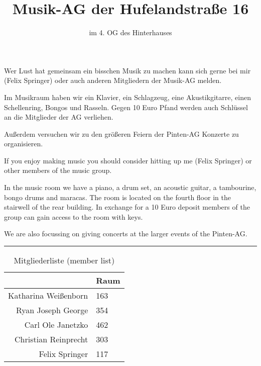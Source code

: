 \documentclass[a4paper,12pt]{scrartcl}
\title{Musik-AG der Hufelandstraße 16}
\subtitle{im 4. OG des Hinterhauses}
\author{}
\date{}
\begin{document}
\maketitle

Wer Lust hat gemeinsam ein bisschen Musik zu machen kann sich gerne bei mir (Felix Springer) oder
auch anderen Mitgliedern der Musik-AG melden.

Im Musikraum haben wir ein Klavier, ein Schlagzeug, eine Akustikgitarre, einen Schellenring, Bongos
und Rasseln.
Gegen 10 Euro Pfand werden auch Schlüssel an die Mitglieder der AG verliehen.

Außerdem versuchen wir zu den größeren Feiern der Pinten-AG Konzerte zu organisieren.

{
    \color{orange}
    If you enjoy making music you should consider hitting up me (Felix Springer) or other members
    of the music group.

    In the music room we have a piano, a drum set, an acoustic guitar, a tambourine, bongo drums
    and maracas.
    The room is located on the fourth floor in the stairwell of the rear building.
    In exchange for a 10 Euro deposit members of the group can gain access to the room
    with keys.

    We are also focussing on giving concerts at the larger events of the Pinten-AG.
}

\noindent\rule{\textwidth}{1pt}

\vspace{20mm}

\begin{table}[h]
    \centering
    \caption{\large{Mitgliederliste {\color{orange} (member list)}}}
    \begin{tabular}{r|l}
        & Raum \color{orange}{(room)} \\
        \midrule
        Katharina Weißenborn & 163 \\
        Ryan Joseph George & 354 \\
        Carl Ole Janetzko & 462 \\
        Christian Reinprecht & 303 \\
        Felix Springer & 117 \\
    \end{tabular}
\end{table}
\end{document}
